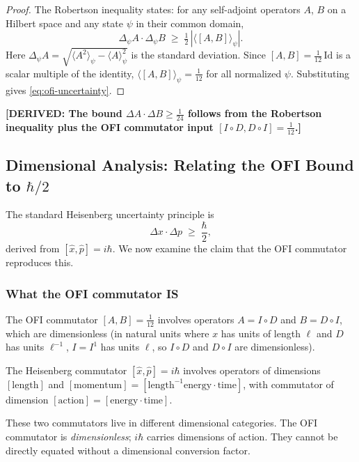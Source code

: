 \documentclass[12pt]{article}
\theoremstyle{definition}
\newcommand{\expect}[1]{\langle #1 \rangle}
\newcommand{\Id}{\mathrm{Id}}
\newcommand{\DERIVED}[1]{\textcolor{derivedcolor}{\textbf{[DERIVED: #1]}}}
\begin{document}
\begin{proof}
The Robertson inequality \cite{Robertson1929} states: for any self-adjoint
operators $A$, $B$ on a Hilbert space and any state $\psi$ in their
common domain,
\[
  \Delta_\psi A \cdot \Delta_\psi B
  \;\geq\;
  \tfrac{1}{2}\,|\expect{[A,B]}_\psi|.
\]
Here $\Delta_\psi A = \sqrt{\expect{A^2}_\psi - \expect{A}_\psi^2}$ is
the standard deviation.  Since $[A,B] = \tfrac{1}{12}\,\Id$ is a
scalar multiple of the identity,
$\expect{[A,B]}_\psi = \tfrac{1}{12}$ for all normalized $\psi$.
Substituting gives \eqref{eq:ofi-uncertainty}.
\end{proof}

\DERIVED{The bound $\Delta A \cdot \Delta B \geq \tfrac{1}{24}$ follows
from the Robertson inequality plus the OFI commutator input
$[I\circ D, D\circ I] = \tfrac{1}{12}$.}

\subsection{Dimensional Analysis: Relating the OFI Bound to $\hbar/2$}

The standard Heisenberg uncertainty principle is
\begin{equation}
  \Delta x \cdot \Delta p
  \;\geq\;
  \frac{\hbar}{2},
  \label{eq:heisenberg}
\end{equation}
derived from $[\hat{x}, \hat{p}] = i\hbar$.  We now examine the claim
that the OFI commutator reproduces this.

\subsubsection{What the OFI commutator IS}

The OFI commutator $[A,B] = \tfrac{1}{12}$ involves operators
$A = I\circ D$ and $B = D\circ I$, which are dimensionless (in natural
units where $x$ has units of length $\ell$ and $D$ has units $\ell^{-1}$,
$I = I^1$ has units $\ell$, so $I\circ D$ and $D\circ I$ are dimensionless).

The Heisenberg commutator $[\hat{x},\hat{p}] = i\hbar$ involves operators
of dimensions $[\text{length}]$ and $[\text{momentum}] = [\text{length}^{-1}
\text{energy} \cdot \text{time}]$, with commutator of dimension
$[\text{action}] = [\text{energy}\cdot\text{time}]$.

These two commutators live in different dimensional categories.
The OFI commutator is \emph{dimensionless}; $i\hbar$ carries
dimensions of action.  They cannot be directly equated without a
dimensional conversion factor.
\end{document}

